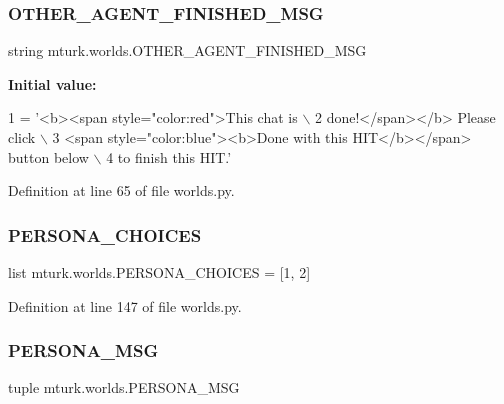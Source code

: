 \subsubsection{\texorpdfstring{O\+T\+H\+E\+R\+\_\+\+A\+G\+E\+N\+T\+\_\+\+F\+I\+N\+I\+S\+H\+E\+D\+\_\+\+M\+SG}{OTHER\_AGENT\_FINISHED\_MSG}}
{\footnotesize\ttfamily string mturk.\+worlds.\+O\+T\+H\+E\+R\+\_\+\+A\+G\+E\+N\+T\+\_\+\+F\+I\+N\+I\+S\+H\+E\+D\+\_\+\+M\+SG}

{\bfseries Initial value\+:}
\begin{DoxyCode}
1 =  \textcolor{stringliteral}{'<b><span style="color:red">This chat is \(\backslash\)}
2 \textcolor{stringliteral}{    done!</span></b> Please click \(\backslash\)}
3 \textcolor{stringliteral}{    <span style="color:blue"><b>Done with this HIT</b></span> button below \(\backslash\)}
4 \textcolor{stringliteral}{    to finish this HIT.'}
\end{DoxyCode}


Definition at line 65 of file worlds.\+py.

\mbox{\label{namespacemturk_1_1worlds_a72f0223c5fde1f3788636255d2095bf3}} 
\subsubsection{\texorpdfstring{P\+E\+R\+S\+O\+N\+A\+\_\+\+C\+H\+O\+I\+C\+ES}{PERSONA\_CHOICES}}
{\footnotesize\ttfamily list mturk.\+worlds.\+P\+E\+R\+S\+O\+N\+A\+\_\+\+C\+H\+O\+I\+C\+ES = \mbox{[}\textquotesingle{}1\textquotesingle{}, \textquotesingle{}2\textquotesingle{}\mbox{]}}



Definition at line 147 of file worlds.\+py.

\mbox{\label{namespacemturk_1_1worlds_a85318fdca056e33e64773efa915bcdca}} 
\subsubsection{\texorpdfstring{P\+E\+R\+S\+O\+N\+A\+\_\+\+M\+SG}{PERSONA\_MSG}}
{\footnotesize\ttfamily tuple mturk.\+worlds.\+P\+E\+R\+S\+O\+N\+A\+\_\+\+M\+SG}

